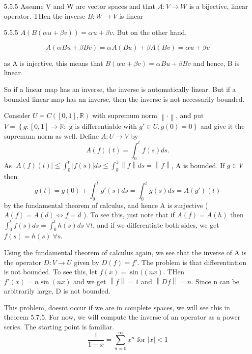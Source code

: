 \documentclass[a4paper,norsk]{article}
\renewcommand{\leq}{\leqslant}
\begin{document}
\begin{propositionbox}{5.5.5}{}
Assume V and W are vector spaces and that $ A : V \to W $ is a bijective, linear operator. THen the inverse $ B : W \to V $  is linear
\begin{proofbox}{5.5.5}{}
    $ A \left( B \left( \alpha_{}^{} u + \beta v \right)  \right) = \alpha_{}^{} u + \beta v  $. But on the other hand,

    \[
        A \left( \alpha_{}^{} Bu + \beta Bv \right) = \alpha_{}^{} A \left( Bu \right) + \beta A \left( Bv \right) = \alpha_{}^{} u + \beta v
    \]

    as A is injective, this means that $ B \left( \alpha_{}^{} u + \beta v \right) = \alpha_{}^{} Bu + \beta B v  $ and hence, B is linear.
\end{proofbox}
\end{propositionbox}


So if a linear map has an inverse, the inverse is automatically linear. But if a bounded linear map has an inverse, then the inverse is not necessarily bounded.


Consider $ U = C \left( \left[ 0, 1 \right] , \mathbb{R} \right)  $ with supremum norm $ \left\lVert \cdot \right\rVert  $, and put $ V = \left\{ g : \left[ 0, 1 \right] \to \mathbb{R} : \text{ g is differentiable with } g' \in U, g(0) = 0 \right\}  $ and give it the supremum norm as well. Define $ A: U \to V $ by
\[
    A(f)(t) = \int_{0}^{t} f(s) ds.
\]
As $ \left| A(f)(t) \right| \leq \int_{0}^{t} \left| f(s) \right| ds \leq \int_{0}^{1} \left\lVert f \right\rVert ds = \left\lVert  f\right\rVert    $, A is bounded. If $ g \in V $ then
\[
    g(t) = g(0) + \int_{0}^{t} g'(s) ds = \int_{0}^{t} g(s) ds = A \left( g' \right) (t)  
\]
by the fundamental theorem of calculus, and hence A is surjective ( $ A(f) = A(d) \iff f=d $ ). To see this, just note that if $ A(f) = A(h) $ then $ \int_{0}^{t} f(s) ds = \int_{0}^{t} h(s) ds \; \forall  t   $, and if we differentiate both sides, we get $ f(s) = h(s) \; \forall  s$.


Using the fundamental theorem of calculus again, we see that the inverse of A is the operator $ D : V \to U $ given by $ D(f) = f' $. The problem is that differentiation is not bounded. To see this, let $ f(x) = \sin((nx)  $. THen $ f'(x) = n \sin(nx)  $ and we get $ \left\lVert f \right\rVert = 1 $ and $ \left\lVert Df \right\rVert = n $. Since n can be arbitrarily large, D is not bounded.


This problem, doesnt occur if we are in complete spaces, we will see this in theorem 5.7.5. For now, we will compute the inverse of an operator as a power series. The starting point is familiar.
\[
    \frac{ 1 }{ 1-x } = \sum_{n=0}^{\infty} x ^{n} \text{ for } \left| x \right| < 1   
\]
\end{document}
